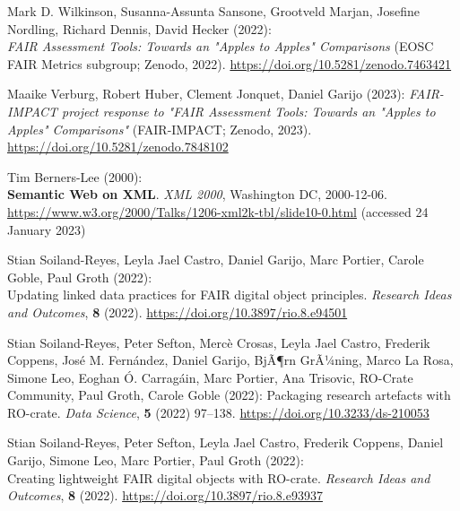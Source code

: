 \begin{thebibliography}{9}
Mark D. Wilkinson, Susanna-Assunta Sansone, Grootveld Marjan, Josefine
Nordling, Richard Dennis, David Hecker (2022): \\
\emph{{FAIR Assessment
Tools: Towards an "Apples to Apples" Comparisons}} ({EOSC} {FAIR}
Metrics subgroup; Zenodo, 2022).
\url{https://doi.org/10.5281/zenodo.7463421}

Maaike Verburg, Robert Huber, Clement Jonquet, Daniel Garijo (2023):
\emph{{FAIR-IMPACT project response to "FAIR Assessment Tools: Towards
an "Apples to Apples" Comparisons"}} ({FAIR-IMPACT}; Zenodo, 2023).
\url{https://doi.org/10.5281/zenodo.7848102}

Tim Berners-Lee (2000): \\
\textbf{Semantic Web on XML}. 
\emph{XML 2000}, Washington DC, 2000-12-06. \\
\url{https://www.w3.org/2000/Talks/1206-xml2k-tbl/slide10-0.html}
(accessed 24 January 2023)

Stian Soiland-Reyes, Leyla Jael Castro, Daniel Garijo, Marc Portier,
Carole Goble, Paul Groth (2022): \\
Updating linked data practices for
{FAIR} digital object principles. \emph{Research Ideas and Outcomes},
\textbf{8} (2022).
\url{https://doi.org/10.3897/rio.8.e94501}

Stian Soiland-Reyes, Peter Sefton, Mercè Crosas, Leyla Jael Castro,
Frederik Coppens, José M. Fernández, Daniel Garijo, BjÃ¶rn GrÃ¼ning,
Marco La Rosa, Simone Leo, Eoghan Ó. Carragáin, Marc Portier, Ana
Trisovic, RO-Crate Community, Paul Groth, Carole Goble (2022):
Packaging research artefacts with {RO}-crate. \emph{Data Science},
\textbf{5} (2022) 97--138.
\url{https://doi.org/10.3233/ds-210053}

Stian Soiland-Reyes, Peter Sefton, Leyla Jael Castro, Frederik Coppens,
Daniel Garijo, Simone Leo, Marc Portier, Paul Groth (2022): \\
Creating
lightweight {FAIR} digital objects with {RO}-crate. \emph{Research Ideas
and Outcomes}, \textbf{8} (2022).
\url{https://doi.org/10.3897/rio.8.e93937}



\end{thebibliography}

